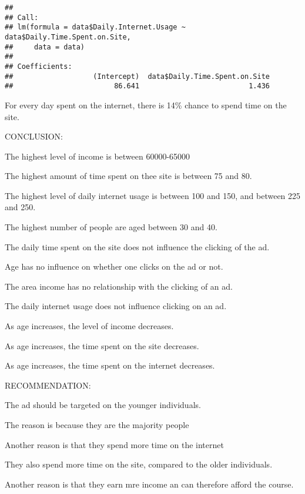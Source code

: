 \documentclass[
]{article}
\newenvironment{Shaded}{\begin{snugshade}}{\end{snugshade}}
\newcommand{\AttributeTok}[1]{\textcolor[rgb]{0.77,0.63,0.00}{#1}}
\newcommand{\FunctionTok}[1]{\textcolor[rgb]{0.00,0.00,0.00}{#1}}
\newcommand{\NormalTok}[1]{#1}
\newcommand{\SpecialCharTok}[1]{\textcolor[rgb]{0.00,0.00,0.00}{#1}}
\begin{document}
\begin{Shaded}
\end{Shaded}

\begin{verbatim}
## 
## Call:
## lm(formula = data$Daily.Internet.Usage ~ data$Daily.Time.Spent.on.Site, 
##     data = data)
## 
## Coefficients:
##                   (Intercept)  data$Daily.Time.Spent.on.Site  
##                        86.641                          1.436
\end{verbatim}

For every day spent on the internet, there is 14\% chance to spend time
on the site.

CONCLUSION:

The highest level of income is between 60000-65000

The highest amount of time spent on thee site is between 75 and 80.

The highest level of daily internet usage is between 100 and 150, and
between 225 and 250.

The highest number of people are aged between 30 and 40.

The daily time spent on the site does not influence the clicking of the
ad.

Age has no influence on whether one clicks on the ad or not.

The area income has no relationship with the clicking of an ad.

The daily internet usage does not influence clicking on an ad.

As age increases, the level of income decreases.

As age increases, the time spent on the site decreases.

As age increases, the time spent on the internet decreases.

RECOMMENDATION:

The ad should be targeted on the younger individuals.

The reason is because they are the majority people

Another reason is that they spend more time on the internet

They also spend more time on the site, compared to the older
individuals.

Another reason is that they earn mre income an can therefore afford the
course.
\end{document}
